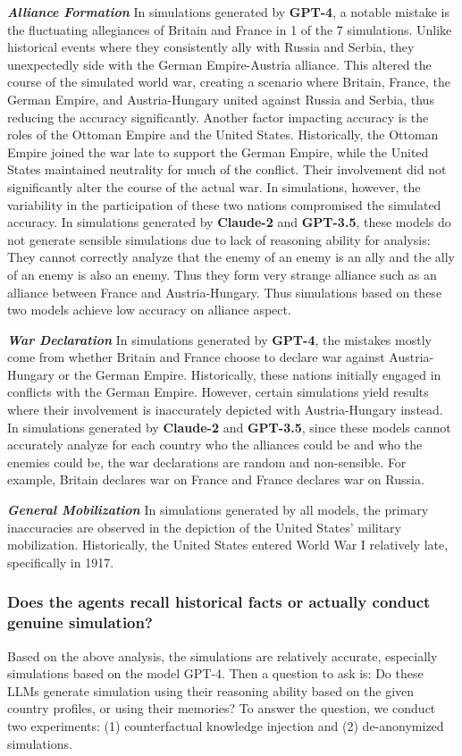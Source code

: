 \documentclass{article}
\begin{document}
\textbf{\textit{Alliance Formation}} In simulations generated by \textbf{GPT-4}, a notable mistake is the fluctuating allegiances of Britain and France in 1 of the 7 simulations. Unlike historical events where they consistently ally with Russia and Serbia, they unexpectedly side with the German Empire-Austria alliance. This altered the course of the simulated world war, creating a scenario where Britain, France, the German Empire, and Austria-Hungary united against Russia and Serbia, thus reducing the accuracy significantly. Another factor impacting accuracy is the roles of the Ottoman Empire and the United States. Historically, the Ottoman Empire joined the war late to support the German Empire, while the United States maintained neutrality for much of the conflict. Their involvement did not significantly alter the course of the actual war. In simulations, however, the variability in the participation of these two nations compromised the simulated accuracy. In simulations generated by \textbf{Claude-2} and \textbf{GPT-3.5}, these models do not generate sensible simulations due to lack of reasoning ability for analysis: They cannot correctly analyze that the enemy of an enemy is an ally and the ally of an enemy is also an enemy. Thus they form very strange alliance such as an alliance between France and Austria-Hungary. Thus simulations based on these two models achieve low accuracy on alliance aspect.

\textbf{\textit{War Declaration}} In simulations generated by \textbf{GPT-4}, the mistakes mostly come from whether Britain and France choose to declare war against Austria-Hungary or the German Empire. Historically, these nations initially engaged in conflicts with the German Empire. However, certain simulations yield results where their involvement is inaccurately depicted with Austria-Hungary instead. In simulations generated by \textbf{Claude-2} and \textbf{GPT-3.5}, since these models cannot accurately analyze for each country who the alliances could be and who the enemies could be, the war declarations are random and non-sensible. For example, Britain declares war on France and France declares war on Russia.

\textbf{\textit{General Mobilization}} In simulations generated by all models, the primary inaccuracies are observed in the depiction of the United States' military mobilization. Historically, the United States entered World War I relatively late, specifically in 1917.


\subsubsection{Does the agents recall historical facts or actually conduct genuine simulation?}
Based on the above analysis, the simulations are relatively accurate, especially simulations based on the model GPT-4. Then a question to ask is: Do these LLMs generate simulation using their reasoning ability based on the given country profiles, or using their memories? To answer the question, we conduct two experiments: (1) counterfactual knowledge injection and (2) de-anonymized simulations. 
\end{document}
